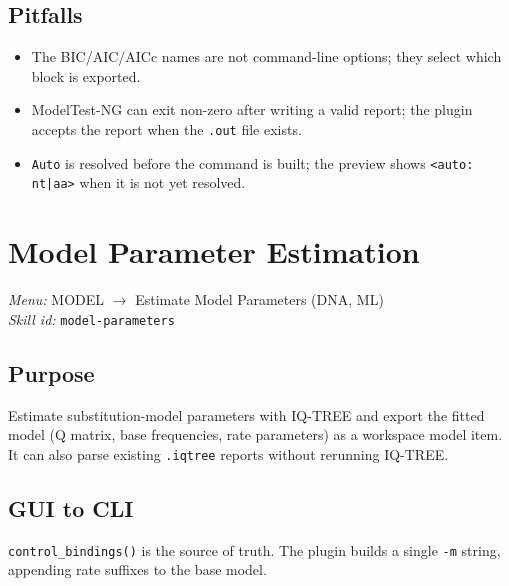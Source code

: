 \documentclass[11pt]{report}
\begin{document}
\subsection{Pitfalls}

\begin{itemize}
  \item The BIC/AIC/AICc names are not command-line options; they select which block is exported.
  \item ModelTest-NG can exit non-zero after writing a valid report; the plugin accepts the report when the \texttt{.\allowbreak out} file exists.
  \item \texttt{Auto} is resolved before the command is built; the preview shows \texttt{<auto: nt|\allowbreak aa>} when it is not yet resolved.
\end{itemize}


\section{Model Parameter Estimation}
\noindent\textit{Menu:} MODEL $\rightarrow$ Estimate Model Parameters (DNA, ML)\\
\noindent\textit{Skill id:} \texttt{model-parameters}

\subsection{Purpose}

Estimate substitution-model parameters with IQ-TREE and export the fitted model (Q matrix, base frequencies, rate parameters) as a workspace model item. It can also parse existing \texttt{.\allowbreak iqtree} reports without rerunning IQ-TREE.

\subsection{GUI to CLI}

\texttt{control\_\allowbreak bindings\allowbreak ()} is the source of truth. The plugin builds a single \texttt{-m} string, appending rate suffixes to the base model.
\end{document}
